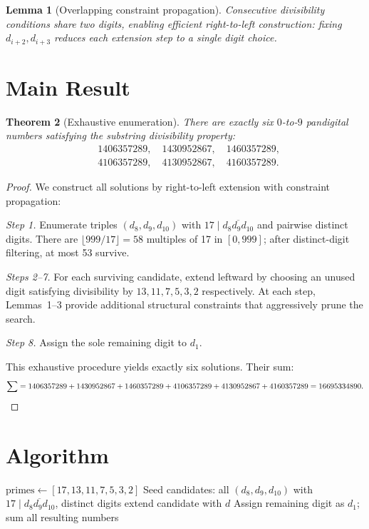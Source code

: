 \documentclass[12pt]{article}
\newtheorem{theorem}{Theorem}
\newtheorem{lemma}[theorem]{Lemma}
\begin{document}
\begin{lemma}[Overlapping constraint propagation]
Consecutive divisibility conditions share two digits, enabling efficient right-to-left construction: fixing $d_{i+2}, d_{i+3}$ reduces each extension step to a single digit choice.
\end{lemma}

\section{Main Result}

\begin{theorem}[Exhaustive enumeration]
There are exactly six $0$-to-$9$ pandigital numbers satisfying the substring divisibility property:
\begin{align*}
&1406357289, \quad 1430952867, \quad 1460357289, \\
&4106357289, \quad 4130952867, \quad 4160357289.
\end{align*}
\end{theorem}

\begin{proof}
We construct all solutions by right-to-left extension with constraint propagation:

\emph{Step 1.} Enumerate triples $(d_8, d_9, d_{10})$ with $17 \mid \overline{d_8 d_9 d_{10}}$ and pairwise distinct digits. There are $\lfloor 999/17 \rfloor = 58$ multiples of 17 in $[0,999]$; after distinct-digit filtering, at most 53 survive.

\emph{Steps 2--7.} For each surviving candidate, extend leftward by choosing an unused digit satisfying divisibility by $13, 11, 7, 5, 3, 2$ respectively. At each step, Lemmas~1--3 provide additional structural constraints that aggressively prune the search.

\emph{Step 8.} Assign the sole remaining digit to $d_1$.

This exhaustive procedure yields exactly six solutions. Their sum:
\[
\sum = 1406357289 + 1430952867 + 1460357289 + 4106357289 + 4130952867 + 4160357289 = 16695334890. \qedhere
\]
\end{proof}

\section{Algorithm}

\begin{algorithm}[H]
\caption{Substring-Divisible Pandigitals}
\begin{algorithmic}[1]
\State $\text{primes} \gets [17, 13, 11, 7, 5, 3, 2]$
\State Seed candidates: all $(d_8, d_9, d_{10})$ with $17 \mid \overline{d_8 d_9 d_{10}}$, distinct digits
                \State extend candidate with $d$
            \EndIf
        \EndFor
    \EndFor
\EndFor
\State Assign remaining digit as $d_1$; sum all resulting numbers
\end{algorithmic}
\end{algorithm}
\end{document}
